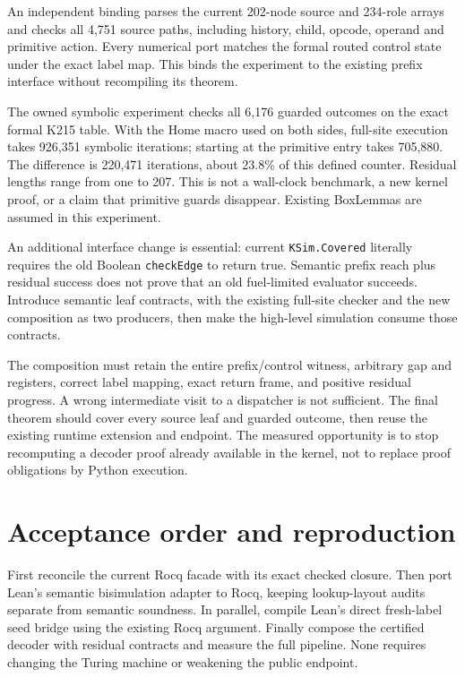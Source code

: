 \documentclass[11pt]{article}
\begin{document}
An independent binding parses the current 202-node source and 234-role arrays and checks all 4,751 source paths, including history, child, opcode, operand and primitive action. Every numerical port matches the formal routed control state under the exact label map. This binds the experiment to the existing prefix interface without recompiling its theorem.

The owned symbolic experiment checks all 6,176 guarded outcomes on the exact formal K215 table. With the Home macro used on both sides, full-site execution takes 926,351 symbolic iterations; starting at the primitive entry takes 705,880. The difference is 220,471 iterations, about 23.8\% of this defined counter. Residual lengths range from one to 207. This is not a wall-clock benchmark, a new kernel proof, or a claim that primitive guards disappear. Existing BoxLemmas are assumed in this experiment.

An additional interface change is essential: current \texttt{KSim.Covered} literally requires the old Boolean \texttt{checkEdge} to return true. Semantic prefix reach plus residual success does not prove that an old fuel-limited evaluator succeeds. Introduce semantic leaf contracts, with the existing full-site checker and the new composition as two producers, then make the high-level simulation consume those contracts.

The composition must retain the entire prefix/control witness, arbitrary gap and registers, correct label mapping, exact return frame, and positive residual progress. A wrong intermediate visit to a dispatcher is not sufficient. The final theorem should cover every source leaf and guarded outcome, then reuse the existing runtime extension and endpoint. The measured opportunity is to stop recomputing a decoder proof already available in the kernel, not to replace proof obligations by Python execution.

\section{Acceptance order and reproduction}
First reconcile the current Rocq facade with its exact checked closure. Then port Lean's semantic bisimulation adapter to Rocq, keeping lookup-layout audits separate from semantic soundness. In parallel, compile Lean's direct fresh-label seed bridge using the existing Rocq argument. Finally compose the certified decoder with residual contracts and measure the full pipeline. None requires changing the Turing machine or weakening the public endpoint.
\end{document}
